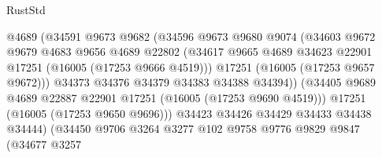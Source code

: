 \begin{lexlean}{RustStd}
\begin{coremodule}
                                    @4689
                                    (@34591
                                      @9673
                                      @9682
                                      (@34596
                                        @9673
                                        @9680
                                        @9074
                                        (@34603
                                          @9672
                                          @9679
                                          @4683
                                          @9656
                                          @4689
                                          @22802
                                          (@34617
                                            @9665
                                            @4689
                                            @34623
                                            @22901
                                            @17251
                                            (@16005 (@17253 @9666 @4519)))
                                          @17251
                                          (@16005 (@17253 @9657 @9672)))
                                        @34373
                                        @34376
                                        @34379
                                        @34383
                                        @34388
                                        @34394))
                                    (@34405
                                      @9689
                                      @4689
                                      @22887
                                      @22901
                                      @17251
                                      (@16005 (@17253 @9690 @4519)))
                                    @17251
                                    (@16005 (@17253 @9650 @9696)))
                                  @34423
                                  @34426
                                  @34429
                                  @34433
                                  @34438
                                  @34444)
                                (@34450
                                  @9706
                                  @3264
                                  @3277
                                  @102
                                  @9758
                                  @9776
                                  @9829
                                  @9847
                                  (@34677
                                    @3257

\end{coremodule}
\end{lexlean}
